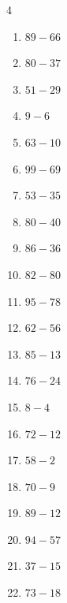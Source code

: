 \begin{multicols}{4}
\begin{enumerate}
  \item $89-66$
        \phantom{$=23$}

  \item $80-37$
        \phantom{$=43$}

  \item $51-29$
        \phantom{$=22$}

  \item $9-6$
        \phantom{$=3$}

  \item $63-10$
        \phantom{$=53$}

  \item $99-69$
        \phantom{$=30$}

  \item $53-35$
        \phantom{$=18$}

  \item $80-40$
        \phantom{$=40$}

  \item $86-36$
        \phantom{$=50$}

  \item $82-80$
        \phantom{$=2$}

  \item $95-78$
        \phantom{$=17$}

  \item $62-56$
        \phantom{$=6$}

  \item $85-13$
        \phantom{$=72$}

  \item $76-24$
        \phantom{$=52$}

  \item $8-4$
        \phantom{$=4$}

  \item $72-12$
        \phantom{$=60$}

  \item $58-2$
        \phantom{$=56$}

  \item $70-9$
        \phantom{$=61$}

  \item $89-12$
        \phantom{$=77$}

  \item $94-57$
        \phantom{$=37$}

  \item $37-15$
        \phantom{$=22$}

  \item $73-18$
        \phantom{$=55$}


\end{enumerate}
\end{multicols}
